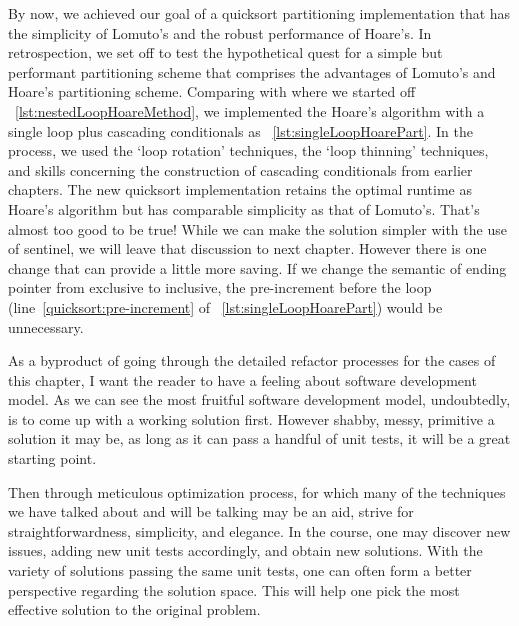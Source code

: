 By now,
we achieved our goal of a quicksort partitioning implementation that has the simplicity of
Lomuto's and the robust performance of Hoare's.
In retrospection, we set off to test the hypothetical quest for a simple but performant
partitioning scheme that comprises the advantages of Lomuto's and Hoare's partitioning scheme.
Comparing with where we started off ~\autoref{lst:nestedLoopHoareMethod},
we implemented the Hoare's algorithm with a single loop plus
cascading conditionals as ~\autoref{lst:singleLoopHoarePart}.
In the process, we used the `loop rotation' techniques, the `loop thinning' techniques,
and skills concerning the construction of cascading conditionals from earlier chapters.
The new quicksort implementation retains the optimal runtime as Hoare's algorithm but has
comparable simplicity as that of Lomuto's.
That's almost too good to be true!
While we can make the solution simpler with the use of sentinel, we will leave that discussion to
next chapter.
However there is one change that can provide a little more saving.
If we change the semantic of ending pointer  from exclusive to inclusive, the
pre-increment before the loop (line~\ref{quicksort:pre-increment} of
~\autoref{lst:singleLoopHoarePart}) would be unnecessary.


As a byproduct of going through the detailed refactor
processes for the cases of this chapter, I want the reader to have a feeling about software
development model.
As we can see the most fruitful software development model, undoubtedly, is to come up with a
working solution first.
However shabby, messy, primitive a solution it may be, as long as it can pass a handful of unit
tests, it will be a great starting point.


Then through meticulous optimization process, for which many of the techniques we have talked
about and will be talking may be an aid, strive for straightforwardness, simplicity, and elegance.
In the course, one may discover new issues, adding new unit tests accordingly, and obtain new
solutions.
With the variety of solutions passing the same unit tests, one can often form a better
perspective regarding the solution space.
This will help one pick the most effective solution to the original problem.


%
%
%



